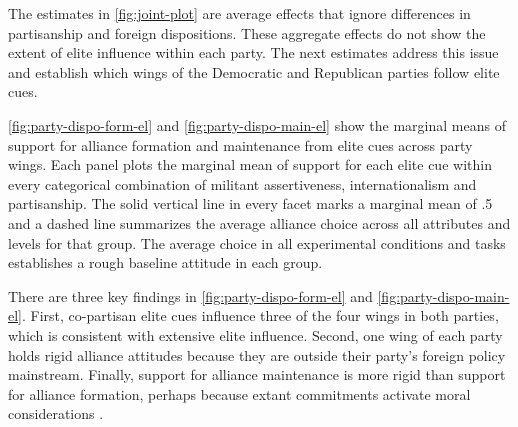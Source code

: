 \documentclass[12pt]{article}
\begin{document}
The estimates in \autoref{fig:joint-plot} are average effects that ignore differences in partisanship and foreign dispositions.
These aggregate effects do not show the extent of elite influence within each party. 
The next estimates address this issue and establish which wings of the Democratic and Republican parties follow elite cues. 


\autoref{fig:party-dispo-form-el} and \autoref{fig:party-dispo-main-el} show the marginal means of support for alliance formation and maintenance from elite cues across party wings.
Each panel plots the marginal mean of support for each elite cue within every categorical combination of militant assertiveness, internationalism and partisanship.
The solid vertical line in every facet marks a marginal mean of .5 and a dashed line summarizes the average alliance choice across all attributes and levels for that group.
The average choice in all experimental conditions and tasks establishes a rough baseline attitude in each group.  


There are three key findings in \autoref{fig:party-dispo-form-el} and \autoref{fig:party-dispo-main-el}. 
First, co-partisan elite cues influence three of the four wings in both parties, which is consistent with extensive elite influence. 
Second, one wing of each party holds rigid alliance attitudes because they are outside their party's foreign policy mainstream.  
Finally, support for alliance maintenance is more rigid than support for alliance formation, perhaps because extant commitments activate moral considerations \citep{TomzWeeks2021}. 
\end{document}
